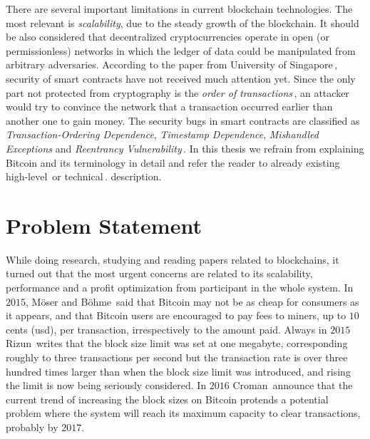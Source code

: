 \documentclass[USenglish]{uit-thesis}
\begin{document}
There are several important limitations in current blockchain technologies.
The most relevant is \emph{scalability}, due to the steady growth of the
blockchain. It should be also considered that
decentralized cryptocurrencies operate in open (or permissionless) networks
in which the ledger of data could be manipulated from arbitrary adversaries.
According to the paper from University of Singapore\,\cite{Luu:2016},
security of smart contracts have not received much attention yet.
Since the only part not protected from cryptography
is the \emph{order of transactions}\,\cite{ethereum_white_paper},
an attacker would try to convince the network that a transaction
occurred earlier than another one to gain money.
The security bugs in smart contracts are classified as
\emph{Transaction-Ordering Dependence},
\emph{Timestamp Dependence}, \emph{Mishandled Exceptions}
and \emph{Reentrancy Vulnerability}\,\cite{Luu:2016}.
In this thesis we refrain from explaining Bitcoin and its terminology in detail
and refer the reader to already existing high-level\,\cite{Underwood:2016:BBB,
Bohme2015BETG}
or technical\,\cite{Nakamoto_bitcoin, ethereum_white_paper}.
description.
\section{Problem Statement}
\label{sec:probdefinition}
While doing research, studying and reading papers related to blockchains,
it turned out that the most urgent concerns are related to
its scalability, performance and a profit optimization from participant
in the whole system.
In $2015$, Möser and Böhme\,\cite{Moser2015} said that
Bitcoin may not be as cheap for consumers as it appears, and
that Bitcoin users are encouraged to pay fees to miners, up
to $10$\,cents (\gls{usd}), per transaction,
irrespectively to the amount paid.
Always in $2015$ Rizun\,\cite{Rizun:2015:blocksizelimit} writes that
the block size limit was set at one megabyte, corresponding
roughly to three transactions per second but
the transaction rate is over three hundred times larger
than when the block size limit was introduced, and rising the limit
is now being seriously considered.
In $2016$ Croman\,\cite{croman2016} announce that
the current trend of increasing the block sizes on Bitcoin protends
a potential problem where the system
will reach its maximum capacity to clear
transactions, probably by $2017$.
\end{document}
